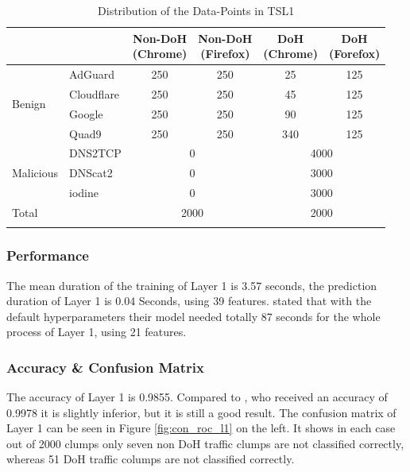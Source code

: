 \begin{center}
\begin{longtable}{ |l|l|c|c|c|c| }
\hline
\multicolumn{2}{|c|}{ } & \makecell{Non-DoH\\(Chrome)} & \makecell{Non-DoH\\(Firefox)} & \makecell{DoH\\(Chrome)} & \makecell{DoH\\(Forefox)} \\
\hline
\multirow{4}{*}{Benign}
& AdGuard & 250 & 250 & 25 & 125 \\
& Cloudflare & 250 & 250 & 45 & 125 \\
& Google & 250 & 250 & 90 & 125 \\
& Quad9 & 250 & 250 & 340 & 125 \\
\hline
\multirow{3}{*}{Malicious}
& DNS2TCP & \multicolumn{2}{|c|}{0} & \multicolumn{2}{|c|}{4000}  \\
& DNScat2 & \multicolumn{2}{|c|}{0} & \multicolumn{2}{|c|}{3000} \\
& iodine & \multicolumn{2}{|c|}{0} & \multicolumn{2}{|c|}{3000} \\
\hline
\multicolumn{2}{|l|}{Total} & \multicolumn{2}{|c|}{2000} & \multicolumn{2}{|c|}{2000} \\
\hline
\caption{Distribution of the Data-Points in TSL1}
\label{tab:tds_l1}
\end{longtable}
\end{center}

\subsubsection{Performance}
The mean duration of the training of Layer 1 is 3.57 seconds, the prediction duration of Layer 1 is 0.04 Seconds, using 39 features. \cite{BehnkeEtAl_FeatureEngineeringMLModelMaliciusDoHTraffic} stated that with the default hyperparameters their model needed totally 87 seconds for the whole process of Layer 1, using 21 features.

\subsubsection{Accuracy \& Confusion Matrix}
The accuracy of Layer 1 is 0.9855. Compared to \cite{BehnkeEtAl_FeatureEngineeringMLModelMaliciusDoHTraffic}, who received an accuracy of 0.9978 it is slightly inferior, but it is still a good result. The confusion matrix of Layer 1 can be seen in Figure \ref{fig:con_roc_l1} on the left. It shows in each case out of 2000 clumps only seven non DoH traffic clumps are not classified correctly, whereas 51 DoH traffic columps are not classified correctly.

